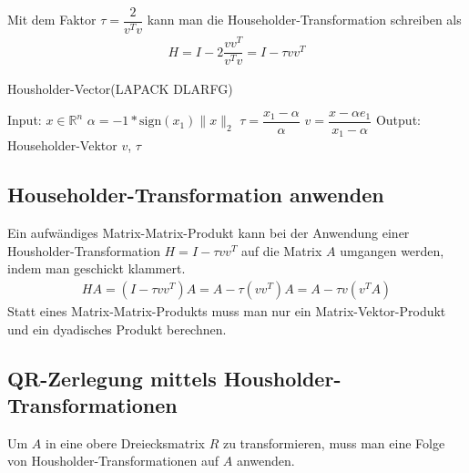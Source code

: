 Mit dem Faktor $\tau = \dfrac{2}{v^Tv}$ kann man die Householder-Transformation schreiben als
\begin{align*}
	H = I - 2 \dfrac{vv^T}{v^Tv} = I - \tau v v^T
\end{align*}



\begin{algorithm}
	\caption{Housholder-Vector(LAPACK DLARFG)}
	\begin{algorithmic}
		\State Input: $x \in \mathbb{R}^n$ 
		\State $\alpha = -1 * \text{sign}(x_1) \|x\|_2$
		\State $\tau = \dfrac{x_1 - \alpha}{\alpha}$
		\State $v=\dfrac{x - \alpha e_1}{x_1 - \alpha}$
		\State Output: Householder-Vektor $v$, $\tau$
	\end{algorithmic} 
	\label{alg:unblockedqr}
\end{algorithm}


\subsection{Householder-Transformation anwenden}
Ein aufwändiges Matrix-Matrix-Produkt kann bei der Anwendung einer Housholder-Transformation $H = I - \tau vv^T$ auf die Matrix $A$ umgangen werden, indem man geschickt klammert.
\begin{align*} 
H A =(I - \tau vv^T) A= A - \tau (vv^T )A = A - \tau v(v^TA)
\end{align*}
Statt eines Matrix-Matrix-Produkts muss man nur ein Matrix-Vektor-Produkt und ein dyadisches Produkt berechnen.

\subsection{QR-Zerlegung mittels Housholder-Transformationen}
Um $A$ in eine obere Dreiecksmatrix $R$ zu transformieren, muss man eine Folge von Housholder-Transformationen auf $A$ anwenden.

